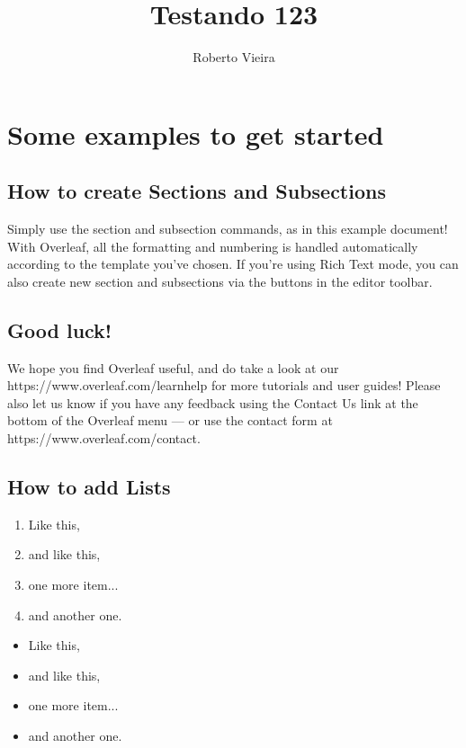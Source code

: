 \documentclass{article}
\title{Testando 123}
\author{Roberto Vieira}
\begin{document}
\section{Some examples to get started}

\subsection{How to create Sections and Subsections}

Simply use the section and subsection commands, as in this example document! With Overleaf, all the formatting and numbering is handled automatically according to the template you've chosen. If you're using Rich Text mode, you can also create new section and subsections via the buttons in the editor toolbar.

\subsection{Good luck!}

We hope you find Overleaf useful, and do take a look at our https://www.overleaf.com/learnhelp for more tutorials and user guides! Please also let us know if you have any feedback using the Contact Us link at the bottom of the Overleaf menu --- or use the contact form at https://www.overleaf.com/contact.

\subsection{How to add Lists}

\begin{enumerate}
\item Like this,
\item and like this,
\item one more item...
\item and another one.
\end{enumerate}

\begin{itemize}
\item Like this,
\item and like this,
\item one more item...
\item and another one.
\end{itemize}
\end{document}
